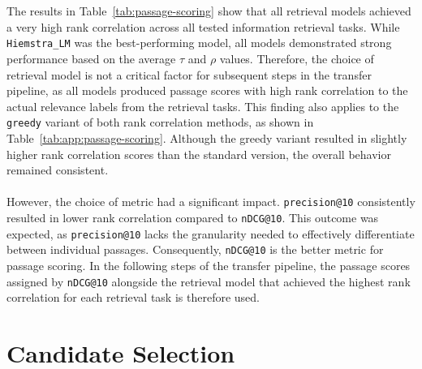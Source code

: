 \\\\
The results in Table~\ref{tab:passage-scoring} show that all retrieval models achieved a very high rank correlation across all tested information retrieval tasks. While \texttt{Hiemstra\_LM} was the best-performing model, all models demonstrated strong performance based on the average $\tau$ and $\rho$ values. Therefore, the choice of retrieval model is not a critical factor for subsequent steps in the transfer pipeline, as all models produced passage scores with high rank correlation to the actual relevance labels from the retrieval tasks. This finding also applies to the \texttt{greedy} variant of both rank correlation methods, as shown in Table~\ref{tab:app:passage-scoring}. Although the greedy variant resulted in slightly higher rank correlation scores than the standard version, the overall behavior remained consistent.
\\\\
However, the choice of metric had a significant impact. \texttt{precision@10} consistently resulted in lower rank correlation compared to \texttt{nDCG@10}. This outcome was expected, as \texttt{precision@10} lacks the granularity needed to effectively differentiate between individual passages. Consequently, \texttt{nDCG@10} is the better metric for passage scoring. In the following steps of the transfer pipeline, the passage scores assigned by \texttt{nDCG@10} alongside the retrieval model that achieved the highest rank correlation for each retrieval task is therefore used.
\pagebreak


\section{Candidate Selection}\label{eval-candidate-selection}

